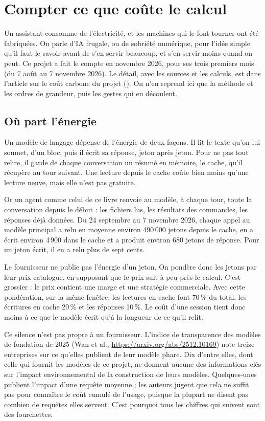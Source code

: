 \chapter{Compter ce que coûte le calcul}\label{ch:sobriete}

Un assistant consomme de l'électricité, et les machines qui le font tourner ont été
fabriquées. On parle d'IA frugale, ou de sobriété numérique, pour l'idée simple qu'il faut
le savoir avant de s'en servir beaucoup, et s'en servir moins quand on peut. Ce projet a
fait le compte en novembre 2026, pour ses trois premiers mois (du 7 août au 7 novembre
2026). Le détail, avec les sources et les calculs, est dans l'article sur le coût carbone
du projet (). On n'en reprend ici que la méthode et les
ordres de grandeur, puis les gestes qui en découlent.

\section{Où part l'énergie}

Un modèle de langage dépense de l'énergie de deux façons. Il lit le texte qu'on lui
soumet, d'un bloc, puis il écrit sa réponse, jeton après jeton. Pour ne pas tout relire, il
garde de chaque conversation un résumé en mémoire, le cache, qu'il récupère au tour
suivant. Une lecture depuis le cache coûte bien moins qu'une lecture neuve, mais elle n'est
pas gratuite.

Or un agent comme celui de ce livre renvoie au modèle, à chaque tour, toute la conversation
depuis le début : les fichiers lus, les résultats des commandes, les réponses déjà
données. Du 24 septembre au 7 novembre 2026, chaque appel au modèle principal a relu en
moyenne environ 490\,000 jetons depuis le cache, en a écrit environ 4\,900 dans le cache
et a produit environ 680 jetons de réponse. Pour un jeton écrit, il en a relu plus de
sept cents.

Le fournisseur ne publie pas l'énergie d'un jeton. On pondère donc les jetons par leur prix
catalogue, en supposant que le prix suit à peu près le calcul. C'est grossier : le prix
contient une marge et une stratégie commerciale. Avec cette pondération, sur la même
fenêtre, les lectures en cache font 70\,\% du total, les écritures en cache 20\,\% et les
réponses 10\,\%. Le coût d'une session tient donc moins à ce que le modèle écrit qu'à la
longueur de ce qu'il relit.

Ce silence n'est pas propre à un fournisseur. L'indice de transparence des modèles de
fondation de 2025 (Wan et al., \url{https://arxiv.org/abs/2512.10169}) note treize
entreprises sur ce qu'elles publient de leur modèle phare. Dix d'entre elles, dont celle
qui fournit les modèles de ce projet, ne donnent aucune des informations clés sur l'impact
environnemental de la construction de leurs modèles. Quelques-unes publient l'impact d'une
requête moyenne ; les auteurs jugent que cela ne suffit pas pour connaître le coût cumulé
de l'usage, puisque la plupart ne disent pas combien de requêtes elles servent. C'est
pourquoi tous les chiffres qui suivent sont des fourchettes.

